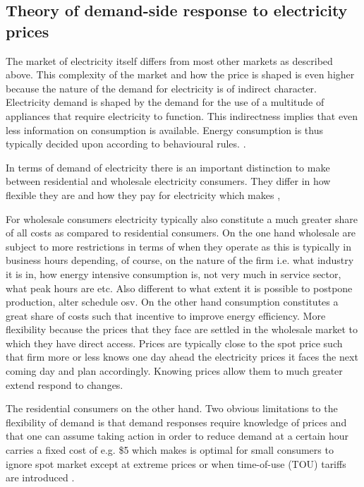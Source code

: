 \subsection{Theory of demand-side response to electricity prices}
\label{subsec:t_demand}
The market of electricity itself differs from most other markets as described above. This complexity of the market and how the price is shaped is even higher because the nature of the demand for electricity is of indirect character. Electricity demand is shaped by the demand for the use of a multitude of appliances that require electricity to function. This indirectness implies that even less information on consumption is available. Energy consumption is thus typically decided upon according to behavioural rules. \citep{kirschen2003demand}. 

In terms of demand of electricity there is an important distinction to make between residential and wholesale electricity consumers. They differ in how flexible they are and how they pay for electricity which makes , 

For wholesale consumers electricity typically also constitute a much greater share of all costs as compared to residential consumers. 
On the one hand wholesale are subject to more restrictions in terms of when they operate as this is typically in business hours depending, of course, on the nature of the firm i.e. what industry it is in, how energy intensive consumption is, not very much in service sector, what peak hours are etc. Also different to what extent it is possible to postpone production, alter schedule osv. On the other hand consumption constitutes a great share of costs such that incentive to improve energy efficiency. More flexibility because the prices that they face are settled in the wholesale market to which they have direct access. Prices are typically close to the spot price such that firm more or less knows one day ahead the electricity prices it faces the next coming day and plan accordingly. Knowing prices allow them to much greater extend respond to changes. 

The residential consumers on the other hand. 
Two obvious limitations to the flexibility of demand is that demand responses require knowledge of prices and that one can assume taking action in order to reduce demand at a certain hour carries a fixed cost of e.g. \$5 which makes is optimal for small consumers to ignore spot market except at extreme prices or when time-of-use (TOU) tariffs are introduced \citep{wolak2011residential}. 

